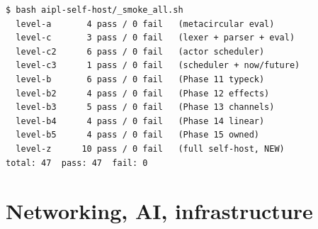 \documentclass[10pt,a4paper,landscape]{article}
\begin{document}
\begin{verbatim}
$ bash aipl-self-host/_smoke_all.sh
  level-a       4 pass / 0 fail   (metacircular eval)
  level-c       3 pass / 0 fail   (lexer + parser + eval)
  level-c2      6 pass / 0 fail   (actor scheduler)
  level-c3      1 pass / 0 fail   (scheduler + now/future)
  level-b       6 pass / 0 fail   (Phase 11 typeck)
  level-b2      4 pass / 0 fail   (Phase 12 effects)
  level-b3      5 pass / 0 fail   (Phase 13 channels)
  level-b4      4 pass / 0 fail   (Phase 14 linear)
  level-b5      4 pass / 0 fail   (Phase 15 owned)
  level-z      10 pass / 0 fail   (full self-host, NEW)
total: 47  pass: 47  fail: 0
\end{verbatim}

\clearpage

\section*{Networking, AI, infrastructure}
\end{document}
